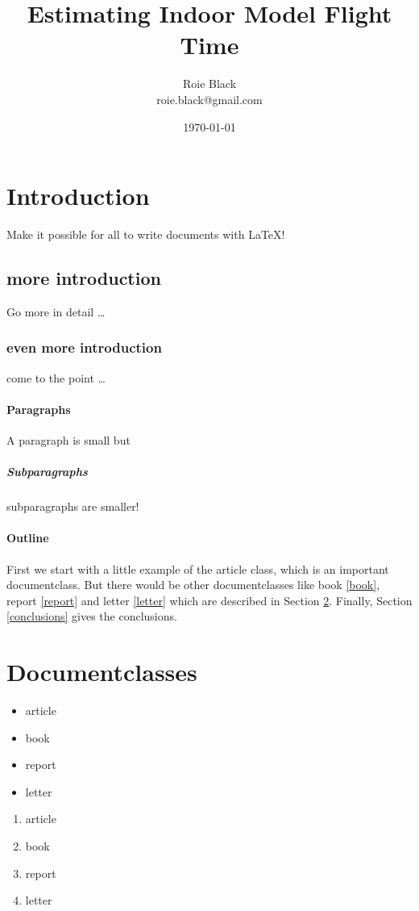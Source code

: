 \documentclass[10pt, letterpaper, oneside, twocolumn, notitlepage]{article}
\title{Estimating Indoor Model Flight Time}
\author{Roie Black  \\
  {\small roie.black@gmail.com}
}
\date{\today}
\begin{document}
\maketitle

\section{Introduction}
Make it possible for all to write documents with \LaTeX{}!

\subsection{more introduction}
Go more in detail \ldots

\subsubsection{even more introduction}
come to the point \ldots

\paragraph{Paragraphs}
A paragraph is small but

\subparagraph{Subparagraphs}
subparagraphs are smaller!

\paragraph{Outline}
First we start with a little example of the article class, which is an
important documentclass. But there would be other documentclasses like
book \ref{book}, report \ref{report} and letter \ref{letter} which are
described in Section \ref{documentclasses}. Finally, Section
\ref{conclusions} gives the conclusions.



\section{Documentclasses} \label{documentclasses}

\begin{itemize}
\item article
\item book
\item report
\item letter
\end{itemize}


\begin{enumerate}
\item article
\item book
\item report
\item letter
\end{enumerate}
\end{document}
